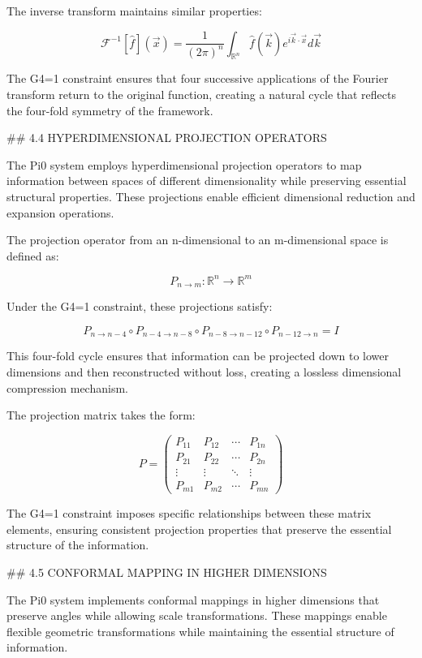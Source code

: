 The inverse transform maintains similar properties:

$$\mathcal{F}^{-1}[\hat{f}](\vec{x}) = \frac{1}{(2\pi)^n} \int_{\mathbb{R}^n} \hat{f}(\vec{k}) e^{i\vec{k}\cdot\vec{x}} d\vec{k}$$

The G4=1 constraint ensures that four successive applications of the Fourier transform return to the original function, creating a natural cycle that reflects the four-fold symmetry of the framework.

## 4.4 HYPERDIMENSIONAL PROJECTION OPERATORS

The Pi0 system employs hyperdimensional projection operators to map information between spaces of different dimensionality while preserving essential structural properties. These projections enable efficient dimensional reduction and expansion operations.

The projection operator from an n-dimensional to an m-dimensional space is defined as:

$$P_{n \rightarrow m}: \mathbb{R}^n \rightarrow \mathbb{R}^m$$

Under the G4=1 constraint, these projections satisfy:

$$P_{n \rightarrow n-4} \circ P_{n-4 \rightarrow n-8} \circ P_{n-8 \rightarrow n-12} \circ P_{n-12 \rightarrow n} = I$$

This four-fold cycle ensures that information can be projected down to lower dimensions and then reconstructed without loss, creating a lossless dimensional compression mechanism.

The projection matrix takes the form:

$$P = \begin{pmatrix} P_{11} & P_{12} & \cdots & P_{1n} \\ P_{21} & P_{22} & \cdots & P_{2n} \\ \vdots & \vdots & \ddots & \vdots \\ P_{m1} & P_{m2} & \cdots & P_{mn} \end{pmatrix}$$

The G4=1 constraint imposes specific relationships between these matrix elements, ensuring consistent projection properties that preserve the essential structure of the information.

## 4.5 CONFORMAL MAPPING IN HIGHER DIMENSIONS

The Pi0 system implements conformal mappings in higher dimensions that preserve angles while allowing scale transformations. These mappings enable flexible geometric transformations while maintaining the essential structure of information.

